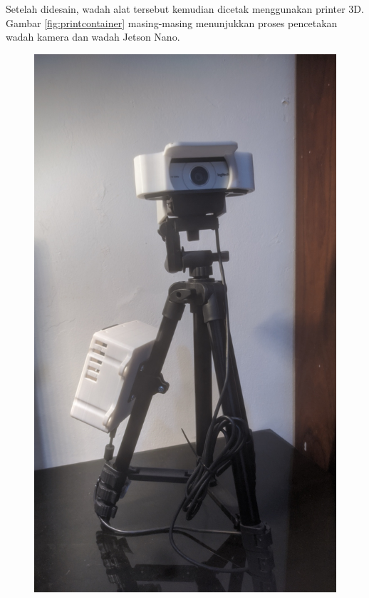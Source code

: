 Setelah didesain, wadah alat tersebut kemudian dicetak menggunakan printer 3D. Gambar \ref{fig:printcontainer} masing-masing menunjukkan proses pencetakan wadah kamera dan wadah Jetson Nano.

\begin{figure}[htbp]
  \centering

  \includegraphics[scale=0.15,angle=-90]{gambar/bab3-case-camera-printed.jpg}

\end{figure}
